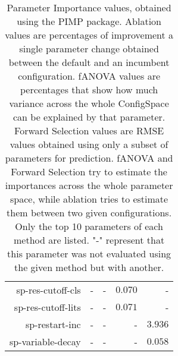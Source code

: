 \begin{table}
\begin{tabular}{r|r|r|r|r}
sp-res-cutoff-cls           &                 - &                 - & $          0.070$ &                 -\\
sp-res-cutoff-lits          &                 - &                 - & $          0.071$ &                 -\\
sp-restart-inc              &                 - &                 - &                 - & $          3.936$\\
sp-variable-decay           &                 - &                 - &                 - & $          0.058$\\
\bottomrule
\end{tabular}
\caption{Parameter Importance values, obtained using the PIMP package. Ablation values are percentages of improvement a single parameter change obtained between the default and an incumbent configuration.
fANOVA values are percentages that show how much variance across the whole ConfigSpace can be explained by that parameter.
Forward Selection values are RMSE values obtained using only a subset of parameters for prediction.
fANOVA and Forward Selection try to estimate the importances across the whole parameter space, while ablation tries to estimate them between two given configurations.
Only the top 10 parameters of each method are listed.
                    "-" represent that this parameter was not evaluated
                     using the given method but with another.
                    }
\label{tab:pimp}
\end{table}
